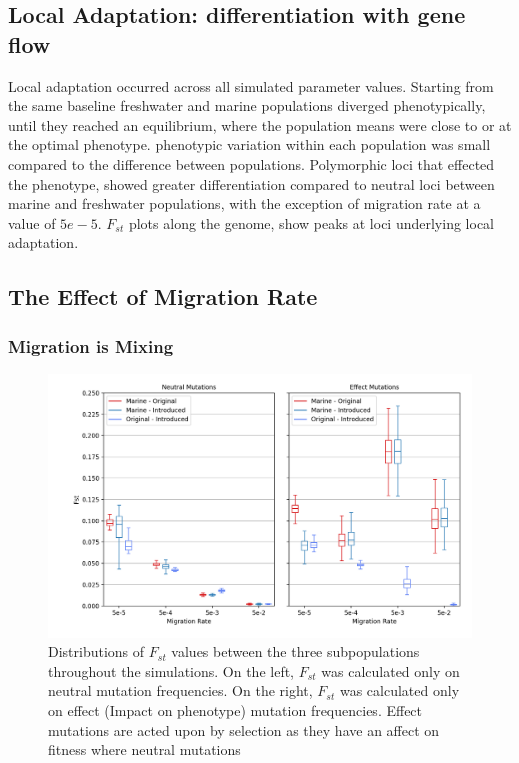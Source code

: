 \documentclass{article}
\begin{document}
\subsection{Local Adaptation: differentiation with gene flow}

Local adaptation occurred across all simulated parameter values.
Starting from the same baseline freshwater and marine populations diverged phenotypically, 
until they reached an equilibrium,
where the population means were close to or at the optimal phenotype. 
phenotypic variation within each population was small compared to the difference between populations.
Polymorphic loci that effected the phenotype,
showed greater differentiation compared to neutral loci between marine and freshwater populations, with the exception 
of migration rate at a value of $5e-5$. 
$F_{st}$ plots along the genome, show peaks at loci underlying local adaptation.



\subsection{The Effect of Migration Rate}

\subsubsection*{Migration is Mixing}


\begin{figure}[htb]
	\begin{center}
  		\includegraphics[width=01.0\linewidth]{matplotlib/Fst.png}
  		\caption{Distributions of $F_{st}$  values between the three subpopulations throughout the simulations.
		On the left, $F_{st}$ was calculated only on neutral mutation frequencies. On the right, $F_{st}$ was calculated
		only on effect (Impact on phenotype) mutation frequencies. 
		Effect mutations are acted upon by selection as they have an affect on fitness where neutral mutations  }
  		\label{fig:Fst}
	\end{center}
\end{figure}
\end{document}
